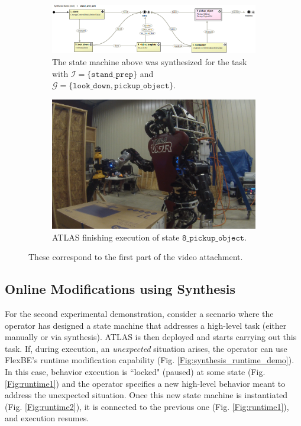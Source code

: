 \begin{figure}[t]
	\centering
	\begin{subfigure}[b]{0.99\columnwidth}
	\includegraphics[width=0.99\columnwidth,clip]{./img/stand_and_pick_sm.png}
	\caption{The state machine above was synthesized for the task with $\mathcal{I} = \{ \mathtt{stand\_prep} \}$ and $\mathcal{G} = \{ \mathtt{look\_down}, \mathtt{pickup\_object} \}$.
	}
	\label{Fig:stand_and_pick_sm}
	\end{subfigure}
	
	\vspace{4 pt}
	\begin{subfigure}[b]{0.95\columnwidth}
	\includegraphics[width=0.99\columnwidth, clip]{./img/stand_and_pick_gopro.png}
	\caption{ATLAS finishing execution of state $\mathtt{8\_pickup\_object}$.
	} 
	\label{Fig:stand_and_pick_gopro}
	\end{subfigure}
	\caption{These correspond to the first part of the video attachment.
	}
	\label{Fig:stand_and_pick_demo}
\end{figure}

\subsection{Online Modifications using Synthesis}

For the second experimental demonstration, consider a scenario where the operator has designed a state machine that addresses a high-level task (either manually or via synthesis).
ATLAS is then deployed and starts carrying out this task.
If, during execution, an \emph{unexpected} situation arises, the operator can use FlexBE's runtime modification capability (Fig. \ref{Fig:synthesis_runtime_demo}).
In this case, behavior execution is ``locked" (paused) at some state (Fig. \ref{Fig:runtime1}) and the operator specifies a new high-level behavior meant to address the unexpected situation.
Once this new state machine is instantiated (Fig. \ref{Fig:runtime2}), it is connected to the previous one (Fig. \ref{Fig:runtime1}), and execution resumes.

